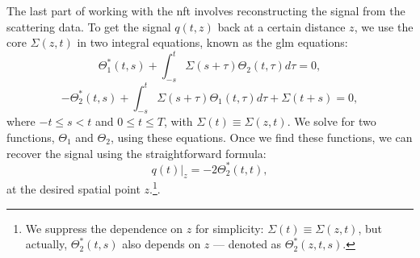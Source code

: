 The last part of working with the \gls{nft} involves reconstructing the signal from the scattering data. To get the signal \( q(t, z) \) back at a certain distance \( z \), we use the core \( \Sigma (z, t) \) in two integral equations, known as the \acrfull{glm} equations:
\begin{equation}
    \Theta_1^{*}(t,s)+\int_{-s}^{t} \Sigma(s+\tau) \Theta_2(t,\tau) d\tau = 0,
    \label{eq:glm_1}
\end{equation}
\begin{equation}
    -\Theta_2^{*}(t,s)+\int_{-s}^{t} \Sigma(s+\tau) \Theta_1(t,\tau) d\tau + \Sigma(t+s) = 0,
    \label{eq:glm_2}
\end{equation}
where \( -t \le s < t \) and \( 0 \le t \le T \), with $ \Sigma (t) \equiv \Sigma (z, t) $. We solve for two functions, \( \Theta_1 \) and \( \Theta_2 \), using these equations. Once we find these functions, we can recover the signal using the straightforward formula:
\begin{equation}
    q(t)|_{z} = -2 \Theta_2^{*}(t,t) {,}
    \label{eq:glm_q}
\end{equation}
at the desired spatial point $z$.\footnote{We suppress the dependence on $z$ for simplicity: $\Sigma(t) \equiv \Sigma(z, t)$, but actually, $\Theta_2^{*}(t, s)$ also depends on $z$ --- denoted as $\Theta_2^{*}(z, t, s)$.
}.




